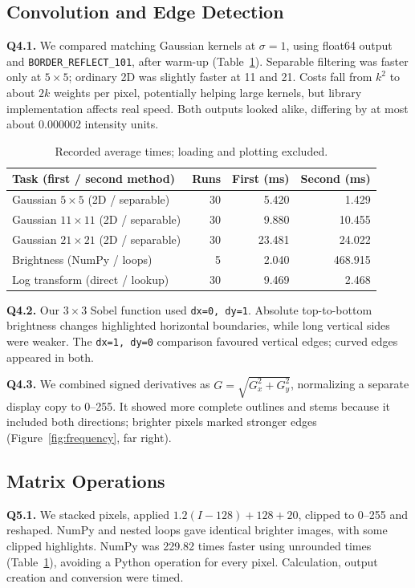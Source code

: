 \documentclass[10pt,a4paper]{article}
\begin{document}
\subsection{Convolution and Edge Detection}
\textbf{Q4.1.} We compared matching Gaussian kernels at \(\sigma=1\), using
float64 output and \texttt{BORDER\_REFLECT\_101}, after warm-up
(Table~\ref{tab:times}). Separable filtering was faster only at \(5\times5\);
ordinary 2D was slightly faster at 11 and 21. Costs fall from \(k^2\) to about
\(2k\) weights per pixel, potentially helping large kernels, but library
implementation affects real speed. Both outputs looked alike, differing by
at most about 0.000002 intensity units.

\begin{table}[H]
\centering\small
\caption{Recorded average times; loading and plotting excluded.}\label{tab:times}
\begin{tabular}{lrrr}\toprule
Task (first / second method) & Runs & First (ms) & Second (ms)\\\midrule
Gaussian \(5\times5\) (2D / separable) & 30 & 5.420 & 1.429\\
Gaussian \(11\times11\) (2D / separable) & 30 & 9.880 & 10.455\\
Gaussian \(21\times21\) (2D / separable) & 30 & 23.481 & 24.022\\
Brightness (NumPy / loops) & 5 & 2.040 & 468.915\\
Log transform (direct / lookup) & 30 & 9.469 & 2.468\\\bottomrule
\end{tabular}
\end{table}

\textbf{Q4.2.} Our \(3\times3\) Sobel function used \texttt{dx=0, dy=1}.
Absolute top-to-bottom brightness changes highlighted horizontal boundaries,
while long vertical sides were weaker. The \texttt{dx=1, dy=0} comparison
favoured vertical edges; curved edges appeared in both.

\textbf{Q4.3.} We combined signed derivatives as
\(G=\sqrt{G_x^2+G_y^2}\), normalizing a separate display copy to 0--255.
It showed more complete outlines and stems because it included both
directions; brighter pixels marked stronger edges (Figure~\ref{fig:frequency}, far right).

\subsection{Matrix Operations}
\textbf{Q5.1.} We stacked pixels, applied \(1.2(I-128)+128+20\), clipped to
0--255 and reshaped. NumPy and nested loops gave identical brighter images,
with some clipped highlights. NumPy was 229.82 times faster using unrounded
times (Table~\ref{tab:times}), avoiding a Python operation for every pixel.
Calculation, output creation and conversion were timed.
\end{document}
